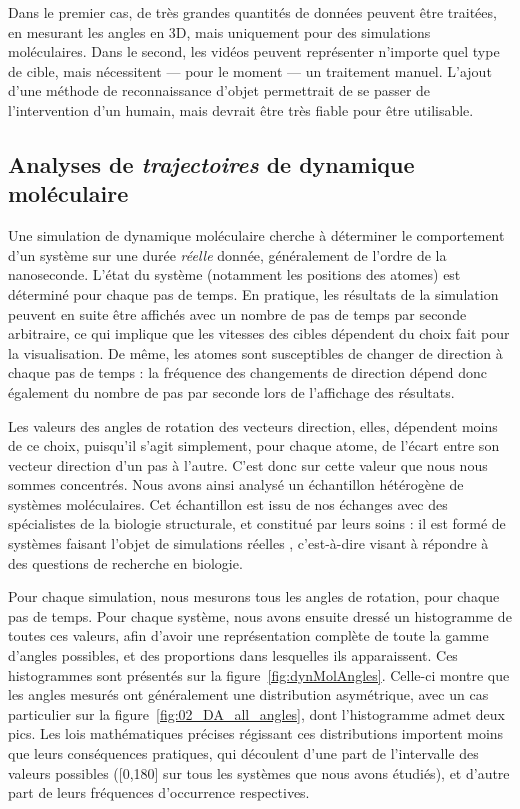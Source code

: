 	Dans le premier cas, de très grandes quantités de données peuvent être traitées, en mesurant les angles en 3D, mais uniquement pour des simulations moléculaires. Dans le second, les vidéos peuvent représenter n'importe quel type de cible, mais nécessitent --- pour le moment --- un traitement manuel. L'ajout d'une méthode de reconnaissance d'objet permettrait de se passer de l'intervention d'un humain, mais devrait être très fiable pour être utilisable.
	
	\subsection{Analyses de \emph{trajectoires} de dynamique moléculaire}
	Une simulation de dynamique moléculaire cherche à déterminer le comportement d'un système sur une durée \emph{réelle} donnée, généralement de l'ordre de la nanoseconde. L'état du système (notamment les positions des atomes) est déterminé pour chaque pas de temps. En pratique, les résultats de la simulation peuvent en suite être affichés avec un nombre de pas de temps par seconde arbitraire, ce qui implique que les vitesses des cibles dépendent du choix fait pour la visualisation. De même, les atomes sont susceptibles de changer de direction à chaque pas de temps : la fréquence des changements de direction dépend donc également du nombre de pas par seconde lors de l'affichage des résultats.
	
	Les valeurs des angles de rotation des vecteurs direction, elles, dépendent moins de ce choix, puisqu'il s'agit simplement, pour chaque atome, de l'écart entre son vecteur direction d'un pas à l'autre. C'est donc sur cette valeur que nous nous sommes concentrés. Nous avons ainsi analysé un échantillon hétérogène de systèmes moléculaires. Cet échantillon est issu de nos échanges avec des spécialistes de la biologie structurale, et constitué par leurs soins : il est formé de systèmes faisant l'objet de simulations \og réelles \fg{}, c'est-à-dire visant à répondre à des questions de recherche en biologie.
	
	Pour chaque simulation, nous mesurons tous les angles de rotation, pour chaque pas de temps. Pour chaque système, nous avons ensuite dressé un histogramme de toutes ces valeurs, afin d'avoir une représentation complète de toute la gamme d'angles possibles, et des proportions dans lesquelles ils apparaissent. Ces histogrammes sont présentés sur la figure~\ref{fig:dynMolAngles}.	Celle-ci montre que les angles mesurés ont généralement une distribution asymétrique, avec un cas particulier sur la figure~\ref{fig:02_DA_all_angles}, dont l'histogramme admet deux pics. Les lois mathématiques précises régissant ces distributions importent moins que leurs conséquences pratiques, qui découlent d'une part de l'intervalle des valeurs possibles ([0,180] sur tous les systèmes que nous avons étudiés), et d'autre part de leurs fréquences d'occurrence respectives.
	
